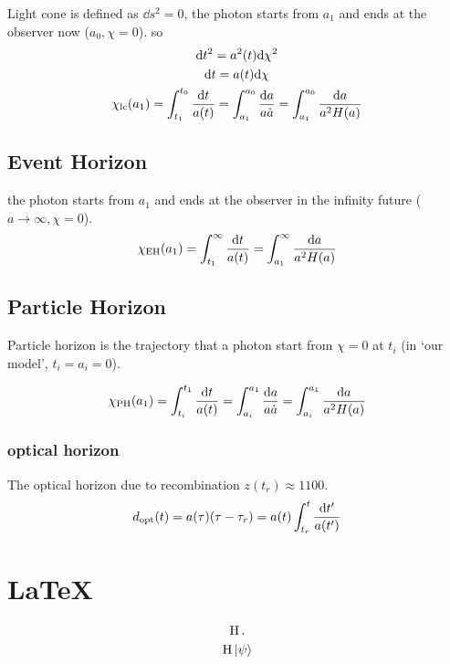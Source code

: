 Light cone is defined as $\dd s^2 = 0$, 
the photon starts from $a_1$ and ends at the observer now ($a_0, \chi=0$).
so 
\begin{gather}
    \dd t^2 = a^2(t) \dd \chi^2 \\ 
    \dd t = a(t) \dd \chi \\ 
    \chi_{\rm lc}(a_1) = \int_{t_1}^{t_0} \frac{\dd t}{a(t)} = \int_{a_1}^{a_0} \frac{\dd a }{a \dot{a}} = \int_{a_1}^{a_0} \frac{\dd a }{a^2 H(a)} 
\end{gather} 


\subsection{Event Horizon}

the photon starts from $a_1$ and ends at the observer in the infinity future ($a\rightarrow \infty, \chi=0$). 
\begin{equation}
    \chi_{\rm EH}(a_1) = \int_{t_1}^{\infty} \frac{\dd t}{a(t)} = \int_{a_1}^{\infty} \frac{\dd a }{a^2 H(a)} 
\end{equation}

\subsection{Particle Horizon}

Particle horizon is the trajectory that a photon start from $\chi = 0$ at $t_i$ (in `our model', $t_i = a_i =0$).

\begin{equation}
    \chi_{\rm PH}(a_1) = \int_{t_i}^{t_1} \frac{\dd t}{a(t)} = \int_{a_i}^{a_1} \frac{\dd a }{a \dot{a}} = \int_{a_i}^{a_1} \frac{\dd a }{a^2 H(a)} 
\end{equation}

\subsubsection{optical horizon}

The optical horizon due to recombination $z(t_r) \approx 1100$.
\begin{equation}
    d_{\mathrm{opt}}(t) = a(\tau) \qty(\tau - \tau_r ) = a(t) \int_{t_r}^t \frac{\dd t'}{a(t')}
\end{equation}




\section*{\LaTeX}


\begin{gather}
    \operatorname{H}.\\
    \operatorname{H} \ket{\psi}
\end{gather}




